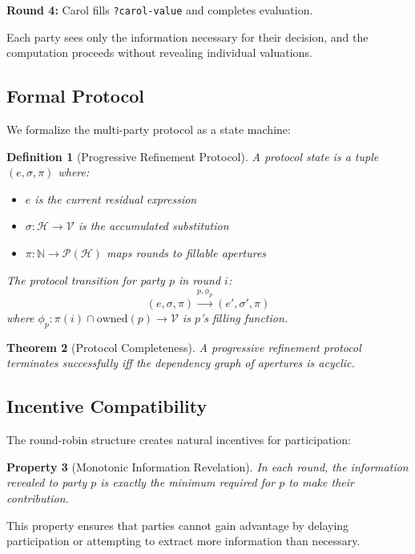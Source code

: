 \documentclass[12pt]{article}
\newtheorem{theorem}{Theorem}
\newtheorem{definition}[theorem]{Definition}
\newtheorem{property}[theorem]{Property}
\begin{document}
\textbf{Round 4:} Carol fills \texttt{?carol-value} and completes evaluation.

Each party sees only the information necessary for their decision, and the computation proceeds without revealing individual valuations.

\subsection{Formal Protocol}

We formalize the multi-party protocol as a state machine:

\begin{definition}[Progressive Refinement Protocol]
A protocol state is a tuple $(e, \sigma, \pi)$ where:
\begin{itemize}
    \item $e$ is the current residual expression
    \item $\sigma : \mathcal{H} \rightarrow \mathcal{V}$ is the accumulated substitution
    \item $\pi : \mathbb{N} \rightarrow \mathcal{P}(\mathcal{H})$ maps rounds to fillable apertures
\end{itemize}

The protocol transition for party $p$ in round $i$:
$$(e, \sigma, \pi) \xrightarrow{p, \phi_p} (e', \sigma', \pi)$$
where $\phi_p : \pi(i) \cap \text{owned}(p) \rightarrow \mathcal{V}$ is $p$'s filling function.
\end{definition}

\begin{theorem}[Protocol Completeness]
A progressive refinement protocol terminates successfully iff the dependency graph of apertures is acyclic.
\end{theorem}

\subsection{Incentive Compatibility}

The round-robin structure creates natural incentives for participation:

\begin{property}[Monotonic Information Revelation]
In each round, the information revealed to party $p$ is exactly the minimum required for $p$ to make their contribution.
\end{property}

This property ensures that parties cannot gain advantage by delaying participation or attempting to extract more information than necessary.
\end{document}
